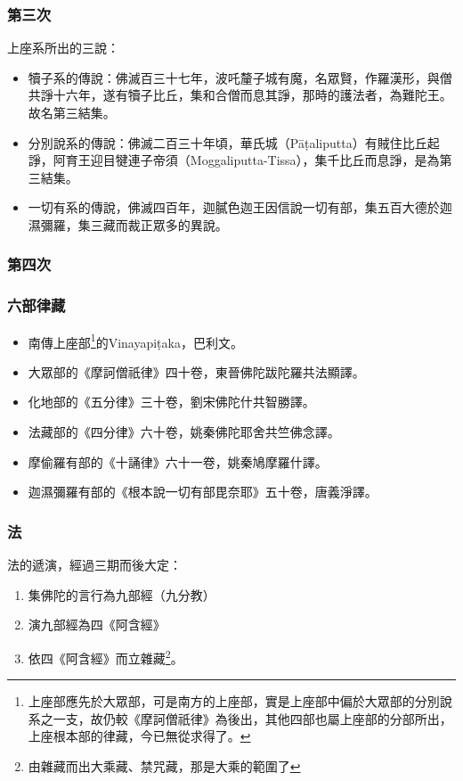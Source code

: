 \subsubsection{第三次}
上座系所出的三說：
\begin{itemize}
  \item 犢子系的傳說：佛滅百三十七年，波吒釐子城有魔，名眾賢，作羅漢形，與僧共諍十六年，遂有犢子比丘，集和合僧而息其諍，那時的護法者，為難陀王。故名第三結集。
  \item 分別說系的傳說：佛滅二百三十年頃，華氏城（Pāṭaliputta）有賊住比丘起諍，阿育王迎目犍連子帝須（Moggaliputta-Tissa），集千比丘而息諍，是為第三結集。
  \item 一切有系的傳說，佛滅四百年，迦膩色迦王因信說一切有部，集五百大德於迦濕彌羅，集三藏而裁正眾多的異說。
\end{itemize}

\subsubsection{第四次}

\subsubsection{六部律藏}
\begin{itemize}
  \item 南傳上座部\footnote{上座部應先於大眾部，可是南方的上座部，實是上座部中偏於大眾部的分別說系之一支，故仍較《摩訶僧祇律》為後出，其他四部也屬上座部的分部所出，上座根本部的律藏，今已無從求得了。}的Vinayapiṭaka，巴利文。
  \item 大眾部的《摩訶僧祇律》四十卷，東晉佛陀跋陀羅共法顯譯。
  \item 化地部的《五分律》三十卷，劉宋佛陀什共智勝譯。
  \item 法藏部的《四分律》六十卷，姚秦佛陀耶舍共竺佛念譯。
  \item 摩偷羅有部的《十誦律》六十一卷，姚秦鳩摩羅什譯。
  \item 迦濕彌羅有部的《根本說一切有部毘奈耶》五十卷，唐義淨譯。
\end{itemize}

\subsubsection{法}
法的遞演，經過三期而後大定：
\begin{enumerate}
  \item 集佛陀的言行為九部經（九分教）
  \item 演九部經為四《阿含經》
  \item 依四《阿含經》而立雜藏\footnote{由雜藏而出大乘藏、禁咒藏，那是大乘的範圍了}。
\end{enumerate}
